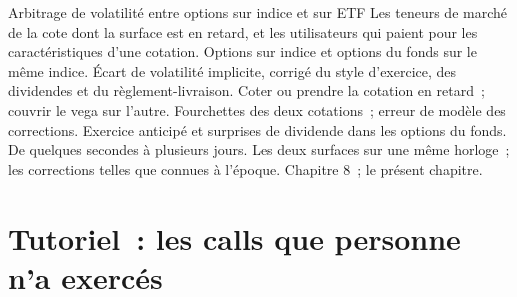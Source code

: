 \begin{strategyfile}{Arbitrage de volatilité entre options sur indice et sur ETF}\label{strat:hf:options-cross-venue-and-volatility-arbitrage-at-speed:indexetf}
 Les teneurs de marché de la cote dont la surface est en retard, et les utilisateurs qui paient pour les caractéristiques d'une cotation.
 Options sur indice et options du fonds sur le même indice.
 Écart de volatilité implicite, corrigé du style d'exercice, des dividendes et du règlement-livraison.
 Coter ou prendre la cotation en retard~; couvrir le vega sur l'autre.
 Fourchettes des deux cotations~; erreur de modèle des corrections.
 Exercice anticipé et surprises de dividende dans les options du fonds.
 De quelques secondes à plusieurs jours.
 Les deux surfaces sur une même horloge~; les corrections telles que connues à l'époque.
 Chapitre 8~; le présent chapitre.
\end{strategyfile}

\section{Tutoriel~: les calls que personne n'a exercés}\label{tut:hf:options-cross-venue-and-volatility-arbitrage-at-speed:tut}

